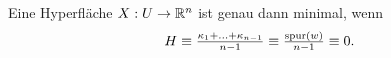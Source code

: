 \documentclass{cheat-sheet}
\begin{document}
\begin{satz}
  Eine Hyperfläche $X : U \to \mathbb{R}^n$ ist genau dann minimal, wenn
  \[ H \equiv \tfrac{\kappa_1 + \ldots + \kappa_{n{-}1}}{n-1} \equiv \tfrac{\operatorname{spur}(w)}{n-1} \equiv 0. \]
\end{satz}


\end{document}
